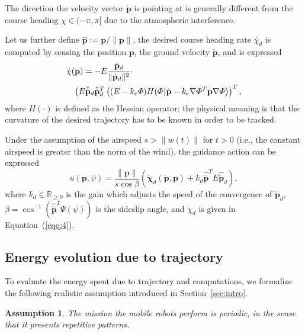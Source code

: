 \documentclass[letterpaper,10pt,conference]{ieeeconf}
\newtheorem{assm}[thm]{Assumption}
\begin{document}
The direction the velocity vector $\dot{\mathbf{p}}$ is pointing at is generally different from the course heading $\chi\in(-\pi,\pi]$ due to the atmospheric interference.

Let us further define $\hat{\mathbf{p}}:=\mathbf{p}/\|\mathbf{p}\|$, the desired course heading rate $\dot{\chi_d}$ is computed by sensing the position $\mathbf{p}$, the ground velocity $\dot{\mathbf{p}}$, and is expressed
\begin{equation}\label{eqq:4}\begin{split}
  &\dot{\chi}(\mathbf{p})=-E\frac{\dot{\mathbf{p}}_d}{\|\dot{\mathbf{p}}_d\|^2}\cdot\\
  &\hspace{2ex}\left( E\hat{\dot{\mathbf{p}}}_d\hat{\dot{\mathbf{p}}}_d^T\left( (E-k_e\varPhi)H(\varPhi)\dot{\mathbf{p}}-k_e\nabla\varPhi^T\dot{\mathbf{p}}\nabla\varPhi \right) \right)^T,
\end{split}
\end{equation} 
where $H(\cdot)$ is defined as the Hessian operator; the physical meaning is that the curvature of the desired trajectory has to be known in order to be tracked.

Under the assumption of the airspeed $s>\|w(t)\|$ for $t>0$ (i.e., the constant airspeed is greater than the norm of the wind), the guidance action can be expressed
\begin{equation}\label{eqq:5}
  u(\mathbf{p},\psi)=\frac{\|\mathbf{p}\|}{s\cos{\beta}}\left( \dot{\mathbf{\chi}}_d(\dot{\mathbf{p}},\mathbf{p})+k_d\hat{\dot{\mathbf{p}}}^TE\hat{\dot{\mathbf{p}}}_d \right),
\end{equation} 
where $k_d\in\mathbb{R}_{\geq 0}$ is the gain which adjusts the speed of the convergence of $\dot{\mathbf{p}}_d$, $\beta=\cos^{-1}{\left( \hat{\dot{\mathbf{p}}}^T\Psi(\psi) \right)}$ is the sideslip angle, and $\dot{\chi}_d$ is given in Equation~(\ref{eqq:4}).

\subsection{Energy evolution due to trajectory}
\label{sec:energy-model}

To evaluate the energy spent due to trajectory and computations, we formalize the following realistic assumption introduced in Section~\ref{sec:intro}.
\begin{assm}\label{assm:2.1}
The mission the mobile robots perform is periodic, in the sense that it presents repetitive patterns.
\end{assm}
\end{document}
